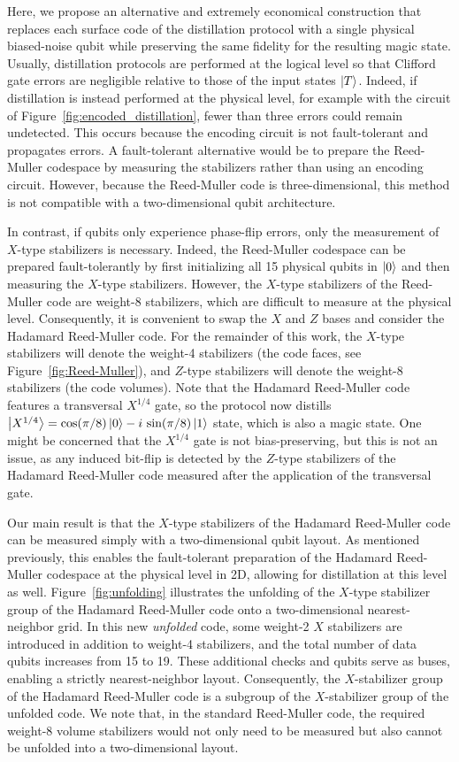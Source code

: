 \documentclass[%
 reprint,
superscriptaddress,
 amsmath,amssymb,
 aps,
]{revtex4-2}
\begin{document}
Here, we propose an alternative and extremely economical construction that replaces each surface code of the distillation protocol with a single physical biased-noise qubit while preserving the same fidelity for the resulting magic state. Usually, distillation protocols are performed at the logical level so that Clifford gate errors are negligible relative to those of the input states $\ket{T}$. Indeed, if distillation is instead performed at the physical level, for example with the circuit of Figure~\ref{fig:encoded_distillation}, fewer than three errors could remain undetected. This occurs because the encoding circuit is not fault-tolerant and propagates errors. A fault-tolerant alternative would be to prepare the Reed-Muller codespace by measuring the stabilizers rather than using an encoding circuit. However, because the Reed-Muller code is three-dimensional, this method is not compatible with a two-dimensional qubit architecture.

In contrast, if qubits only experience phase-flip errors, only the measurement of $X$-type stabilizers is necessary. Indeed, the Reed-Muller codespace can be prepared fault-tolerantly by first initializing all 15 physical qubits in $\ket{0}$ and then measuring the $X$-type stabilizers. However, the $X$-type stabilizers of the Reed-Muller code are weight-8 stabilizers, which are difficult to measure at the physical level. Consequently, it is convenient to swap the $X$ and $Z$ bases and consider the Hadamard Reed-Muller code. For the remainder of this work, the $X$-type stabilizers will denote the weight-4 stabilizers (the code faces, see Figure~\ref{fig:Reed-Muller}), and $Z$-type stabilizers will denote the weight-8 stabilizers (the code volumes). Note that the Hadamard Reed-Muller code features a transversal $X^{1/4}$ gate, so the protocol now distills $\ket{X^{1/4}} = \text{cos}(\pi/8)\ket{0} - i\ \text{sin}(\pi/8)\ket{1}$ state, which is also a magic state. One might be concerned that the $X^{1/4}$ gate is not bias-preserving, but this is not an issue, as any induced bit-flip is detected by the $Z$-type stabilizers of the Hadamard Reed-Muller code measured after the application of the transversal gate.

Our main result is that the $X$-type stabilizers of the Hadamard Reed-Muller code can be measured simply with a two-dimensional qubit layout. As mentioned previously, this enables the fault-tolerant preparation of the Hadamard Reed-Muller codespace at the physical level in 2D, allowing for distillation at this level as well. Figure~\ref{fig:unfolding} illustrates the unfolding of the $X$-type stabilizer group of the Hadamard Reed-Muller code onto a two-dimensional nearest-neighbor grid. In this new \textit{unfolded} code, some weight-2 $X$ stabilizers are introduced in addition to weight-4 stabilizers, and the total number of data qubits increases from 15 to 19. These additional checks and qubits serve as buses, enabling a strictly nearest-neighbor layout. Consequently, the $X$-stabilizer group of the Hadamard Reed-Muller code is a subgroup of the $X$-stabilizer group of the unfolded code. We note that, in the standard Reed-Muller code, the required weight-8 volume stabilizers would not only need to be measured but also cannot be unfolded into a two-dimensional layout.
\end{document}
